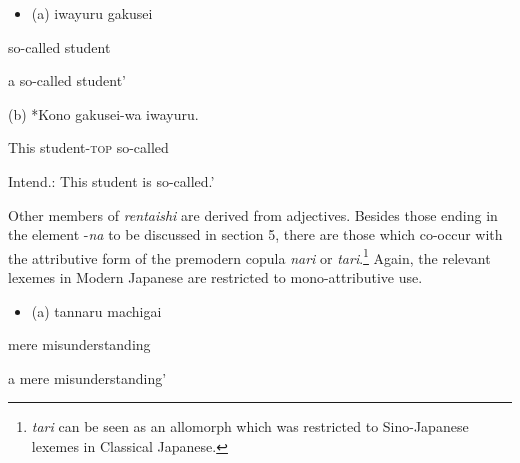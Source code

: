 \documentclass[output=paper]{langscibook}
\begin{document}
\begin{itemize}
\item \begin{styleBeispielCinqueKapitel}
(a) iwayuru gakusei
\end{styleBeispielCinqueKapitel}
\end{itemize}
\begin{styleBeispielCinqueKapitel}
so-called student
\end{styleBeispielCinqueKapitel}

\begin{styleBeispielCinqueKapitel}
{\textasciigrave}a so-called student'
\end{styleBeispielCinqueKapitel}

\begin{styleBeispielCinqueKapitel}
(b) *Kono gakusei-wa iwayuru.
\end{styleBeispielCinqueKapitel}

\begin{styleBeispielCinqueKapitel}
This student-\textsc{top} so-called
\end{styleBeispielCinqueKapitel}

\begin{styleBeispielCinqueKapitel}
Intend.: {\textasciigrave}This student is so-called.’
\end{styleBeispielCinqueKapitel}

Other members of \textit{rentaishi} are derived from adjectives. Besides those ending in the element -\textit{na} to be discussed in section 5, there are those which co-occur with the attributive form of the premodern copula \textit{nari} or \textit{tari}.\footnote{\textit{tari} can be seen as an allomorph which was restricted to Sino-Japanese lexemes in Classical Japanese.} Again, the relevant lexemes in Modern Japanese are restricted to mono-attributive use.

\begin{itemize}
\item \begin{styleBeispielCinqueKapitel}
(a) tannaru machigai
\end{styleBeispielCinqueKapitel}
\end{itemize}
\begin{styleBeispielCinqueKapitel}
mere misunderstanding
\end{styleBeispielCinqueKapitel}

\begin{styleBeispielCinqueKapitel}
{\textasciigrave}a mere misunderstanding'
\end{styleBeispielCinqueKapitel}
\end{document}
